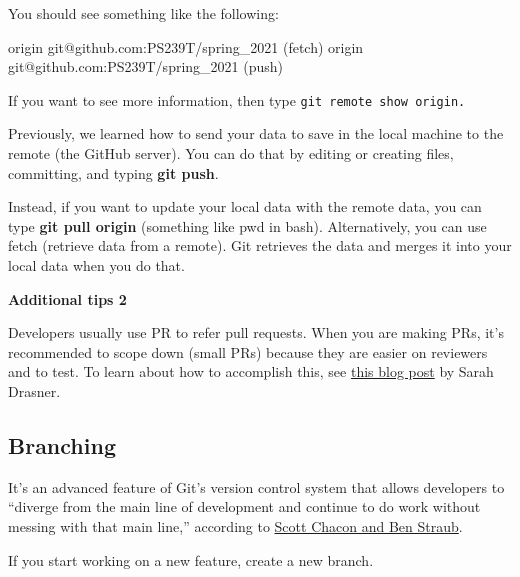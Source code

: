 \documentclass[
]{book}
\newenvironment{Shaded}{\begin{snugshade}}{\end{snugshade}}
\newcommand{\ExtensionTok}[1]{#1}
\newcommand{\FunctionTok}[1]{\textcolor[rgb]{0.00,0.00,0.00}{#1}}
\newcommand{\NormalTok}[1]{#1}
\begin{document}
You should see something like the following:

\begin{Shaded}
\begin{Highlighting}[]
\ExtensionTok{origin}\NormalTok{  git@github.com:PS239T/spring\_2021 (fetch)}
\ExtensionTok{origin}\NormalTok{  git@github.com:PS239T/spring\_2021 (push)}
\end{Highlighting}
\end{Shaded}

If you want to see more information, then type \texttt{git\ remote\ show\ origin.}

Previously, we learned how to send your data to save in the local machine to the remote (the GitHub server). You can do that by editing or creating files, committing, and typing \textbf{git push}.

Instead, if you want to update your local data with the remote data, you can type \textbf{git pull origin} (something like pwd in bash). Alternatively, you can use fetch (retrieve data from a remote). Git retrieves the data and merges it into your local data when you do that.

\begin{Shaded}
\end{Shaded}

\textbf{Additional tips 2}

Developers usually use PR to refer pull requests. When you are making PRs, it's recommended to scope down (small PRs) because they are easier on reviewers and to test. To learn about how to accomplish this, see \href{https://www.netlify.com/blog/2020/03/31/how-to-scope-down-prs/}{this blog post} by Sarah Drasner.

\hypertarget{branching}{%
\subsection{Branching}\label{branching}}

It's an advanced feature of Git's version control system that allows developers to ``diverge from the main line of development and continue to do work without messing with that main line,'' according to \href{https://git-scm.com/book/en/v1/Git-Branching}{Scott Chacon and Ben Straub}.

If you start working on a new feature, create a new branch.
\end{document}
